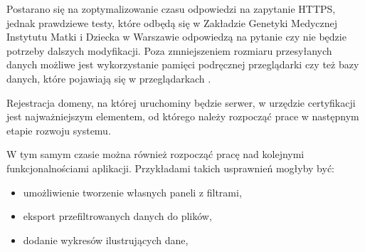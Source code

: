 \documentclass[a4paper,12pt,twoside]{article}
\begin{document}
Postarano się na zoptymalizowanie czasu odpowiedzi na zapytanie HTTPS,
jednak prawdziewe testy, które odbędą się w Zakładzie Genetyki Medycznej Instytutu Matki i Dziecka w Warszawie odpowiedzą na pytanie czy 
nie będzie potrzeby dalszych modyfikacji. Poza zmniejszeniem
rozmiaru przesyłanych danych możliwe jest wykorzystanie pamięci podręcznej
przeglądarki czy też bazy danych, które pojawiają się w przeglądarkach  \cite{w3cDatabase}.

Rejestracja domeny, na której uruchominy będzie serwer,
w urzędzie certyfikacji jest najważniejszym elementem,
od którego należy rozpocząć prace w następnym etapie rozwoju systemu.

W tym samym czasie można również rozpocząć pracę nad kolejnymi funkcjonalnościami
aplikacji. Przykładami takich usprawnień mogłyby być:
\begin{itemize}
\item umożliwienie tworzenie własnych paneli z filtrami,
\item eksport przefiltrowanych danych do plików,
\item dodanie wykresów ilustrujących dane,
\end{itemize}
\end{document}
